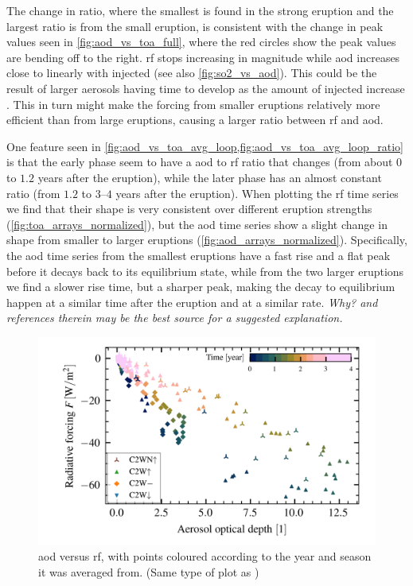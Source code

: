 \documentclass[twocol]{ametsocV5}
\begin{document}
The change in ratio, where the smallest is found in the strong eruption and the largest
ratio is from the small eruption, is consistent with the change in peak values seen in
\cref{fig:aod_vs_toa_full}, where the red circles show the peak values are bending off
to the right. \acrshort{rf} stops increasing in magnitude while \acrshort{aod} increases
close to linearly with injected  (see also \cref{fig:so2_vs_aod}). This could be
the result of larger aerosols having time to develop as the amount of injected 
increase \citep{marshall2019}. This in turn might make the forcing from smaller
eruptions relatively more efficient than from large eruptions, causing a larger ratio
between \acrshort{rf} and \acrshort{aod}.

One feature seen in \cref{fig:aod_vs_toa_avg_loop,fig:aod_vs_toa_avg_loop_ratio} is that
the early phase seem to have a \acrshort{aod} to \acrshort{rf} ratio that changes (from
about \( 0 \) to \( 1.2 \) years after the eruption), while the later phase has an
almost constant ratio (from \( 1.2 \) to \( 3 \)--\( 4 \) years after the eruption).
When plotting the \acrshort{rf} time series we find that their shape is very consistent
over different eruption strengths (\cref{fig:toa_arrays_normalized}), but the
\acrshort{aod} time series show a slight change in shape from smaller to larger
eruptions (\cref{fig:aod_arrays_normalized}). Specifically, the \acrshort{aod} time
series from the smallest eruptions have a fast rise and a flat peak before it decays
back to its equilibrium state, while from the two larger eruptions we find a slower rise
time, but a sharper peak, making the decay to equilibrium happen at a similar time after
the eruption and at a similar rate. \emph{Why? \citet{marshall2019} and references
  therein may be the best source for a suggested explanation.}

\begin{figure}
  \begin{center}
    \includegraphics[width=0.95\linewidth]{figures/aod_vs_toa_avg_loop.png}
  \end{center}
  \caption{
    \acrshort{aod} versus \acrshort{rf}, with points coloured according to the year and
    season it was averaged from. (Same type of plot as \citet{gregory2016})
  }%
  \label{fig:aod_vs_toa_avg_loop}
\end{figure}
\end{document}
